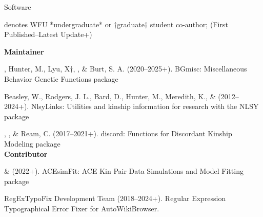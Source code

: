 \begin{rSection}{\textrm{Software}}%
\vspace{-1mm}\begin{center}\footnotesize{denotes WFU *undergraduate* or $\dagger$graduate$\dagger$ student co-author; (First Published–Latest Update+)}\end{center}\vspace{-1mm}

{\large \textbf {Maintainer}}%
\begin{etaremune}
\item\meb, Hunter, M., Lyu, X$\dagger$, \jt, \& Burt, S. A. (2020–2025+). BGmisc: Miscellaneous Behavior Genetic Functions \R package %

\item  Beasley, W., Rodgers, J. L., Bard, D., Hunter, M., Meredith, K., \& \meb  (2012–2024+). NlsyLinks: Utilities and kinship information for research with the NLSY \R package 

\item\meb, \jt, \& Ream, C. (2017–2021+). discord: Functions for Discordant Kinship Modeling \R package 
%
%
\smallskip\\
\hspace*{-8mm}\large{\bf{Contributor}}
\item \xyl  \& \meb (2022+). ACEsimFit: ACE Kin Pair Data Simulations and Model Fitting \R package 


\item RegExTypoFix Development Team (2018–2024+). Regular Expression Typographical Error Fixer for Auto\allowbreak WikiBrowser. 
%
%
%
\end{etaremune}
\end{rSection}

